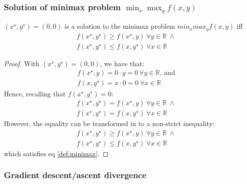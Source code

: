 \documentclass[12pt]{article}
\begin{document}
\subsubsection{Solution of minimax problem \texorpdfstring{$\min_{x} \max_{y} f(x, y)$}{Lg}}

$ (x^{\star},y^{\star})=(0,0)$ is a solution to the minimax problem $min_x max_y f(x,y)$ iff
\begin{equation}
\begin{gathered} \label{def:minimax}
    f(x^{\star},y^{\star}) \geq f(x^{\star},y) \ \forall y \in \mathbb{R} \ \land
    \\ f(x^{\star},y^{\star}) \leq f(x,y^{\star}) \ \forall x \in \mathbb{R}
\end{gathered}
\end{equation}
\begin{proof}
With $(x^{\star}, y^{\star}) = (0, 0)$, we have that:
\begin{equation}
\begin{gathered}
    f(x^{\star}, y) = 0 \cdot y = 0 \ \forall y \in \mathbb{R} \text{, and} \\
    f(x, y^{\star}) = x \cdot 0 = 0 \ \forall x \in \mathbb{R}
\end{gathered}
\end{equation}
Hence, recalling that $f(x^{\star}, y^{\star}) = 0$:
\begin{equation}
\begin{gathered}
    f(x^{\star}, y^{\star}) = f(x^{\star}, y)  \ \forall y \in \mathbb{R} \ \land \\
    f(x^{\star}, y^{\star}) = f(x, y^{\star})  \ \forall x \in \mathbb{R}
\end{gathered}
\end{equation}
However, the equality can be transformed in to a non-strict inequality:
\begin{equation}
\begin{gathered}
    f(x^{\star}, y^{\star}) \geq f(x^{\star}, y)  \ \forall y \in \mathbb{R} \ \land \\
    f(x^{\star}, y^{\star}) \leq f(x, y^{\star})  \ \forall x \in \mathbb{R}
\end{gathered}
\end{equation}
which satisfies eq \eqref{def:minimax}.

\end{proof}

\subsubsection{Gradient descent/ascent divergence} \label{subsub:grad-divergence}
\end{document}

